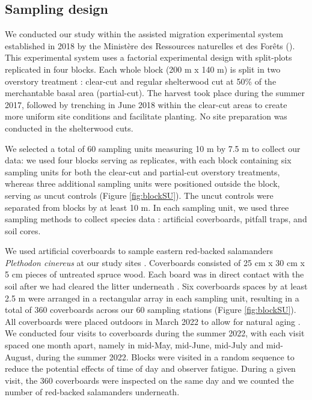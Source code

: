 \subsection*{Sampling design}
\label{subsec:sampling}

We conducted our study within the assisted migration experimental system established in 2018 by the Ministère des Ressources naturelles et des Forêts (\citealp{royoDesiredREgenerationAssisted2023}). 
This experimental system uses a factorial experimental design with split-plots replicated in four blocks. 
Each whole block (200 m x 140 m) is split in two overstory treatment : clear-cut and regular shelterwood cut at 50\% of the merchantable basal area (partial-cut). 
The harvest took place during the summer 2017, followed by trenching in June 2018 within the clear-cut areas to create more uniform site conditions and facilitate planting. 
No site preparation was conducted in the shelterwood cuts.

We selected a total of 60 sampling units measuring 10 m by 7.5 m to collect our data: we used four blocks serving as replicates, 
with each block containing six sampling units for both the clear-cut and partial-cut overstory treatments, 
whereas three additional sampling units were positioned outside the block, serving as uncut controls (Figure \ref*{fig:blockSU}). 
The uncut controls were separated from blocks by at least 10 m. 
In each sampling unit, we used three sampling methods to collect species data : artificial coverboards, pitfall traps, and soil cores.

We used artificial coverboards to sample eastern red-backed salamanders \textit{Plethodon cinereus} at our study sites \citep{hydeSamplingPlethodontidSalamanders2001,mooreComparisonPopulationEastern2009c,hesedUncoveringSalamanderEcology2012,Mazerolle2021Woodlandsalamander}. 
Coverboards consisted of 25 cm x 30 cm x 5 cm pieces of untreated spruce wood. Each board was in direct contact with the soil after we had cleared the litter underneath \citep{Mazerolle2021Woodlandsalamander}. 
Six coverboards spaces by at least 2.5 m were arranged in a rectangular array in each sampling unit, resulting in a total of 360 coverboards across our 60 sampling stations (Figure \ref{fig:blockSU}). 
All coverboards were placed outdoors in March 2022 to allow for natural aging \citep{hedrickEffectsCoverboardAge2021,Grasser2014Effectscover}. 
We conducted four visits to coverboards during the summer 2022, with each visit spaced one month apart, namely in mid-May, mid-June, mid-July and mid-August, during the summer 2022. 
Blocks were visited in a random sequence to reduce the potential effects of time of day and observer fatigue. 
During a given visit, the 360 coverboards were inspected on the same day and we counted the number of red-backed salamanders underneath.  

